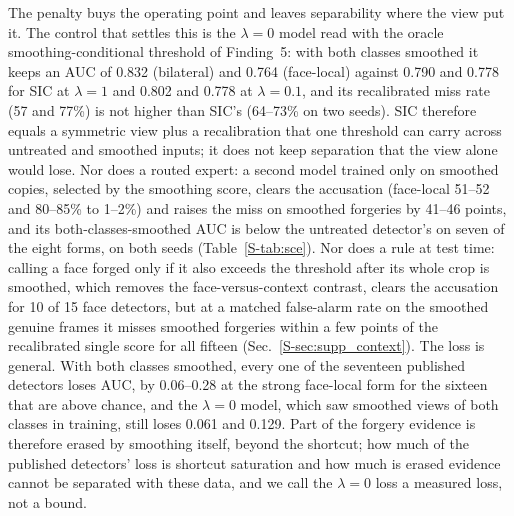 \documentclass[conference]{IEEEtran}
\begin{document}
The penalty buys the operating point and leaves separability where the view put it. The control that settles this is the $\lambda=0$ model read with
the oracle smoothing-conditional threshold of Finding~5: with both classes smoothed it keeps an AUC of 0.832 (bilateral) and
0.764 (face-local) against 0.790 and 0.778 for SIC at $\lambda=1$ and 0.802 and 0.778 at $\lambda=0.1$, and its
recalibrated miss rate (57 and 77\%) is not higher than SIC's (64--73\% on two seeds).
SIC therefore equals a symmetric view plus a recalibration that one threshold can carry across untreated and smoothed
inputs; it does not keep separation that the view alone would lose. Nor does a routed expert: a second model trained only on
smoothed copies, selected by the smoothing score, clears the accusation (face-local 51--52 and 80--85\% to 1--2\%) and raises
the miss on smoothed forgeries by 41--46 points, and its both-classes-smoothed AUC is below the untreated detector's on seven
of the eight forms, on both seeds (Table~\ref{S-tab:sce}).
Nor does a rule at test time: calling a face forged only if it also exceeds the threshold after its whole crop is smoothed,
which removes the face-versus-context contrast, clears the accusation for 10 of 15 face detectors, but at a matched false-alarm
rate on the smoothed genuine frames it misses smoothed forgeries within a few points of the recalibrated single score for all
fifteen (Sec.~\ref{S-sec:supp_context}).
The loss is general. With both classes smoothed, every one of the seventeen published detectors loses AUC, by 0.06--0.28 at
the strong face-local form for the sixteen that are above chance, and the $\lambda=0$ model, which saw smoothed views of both
classes in training, still loses 0.061 and 0.129.
Part of the forgery evidence is therefore erased by smoothing itself, beyond the shortcut; how much of the published
detectors' loss is shortcut saturation and how much is erased evidence cannot be separated with these data, and we call the
$\lambda=0$ loss a measured loss, not a bound.
\end{document}
